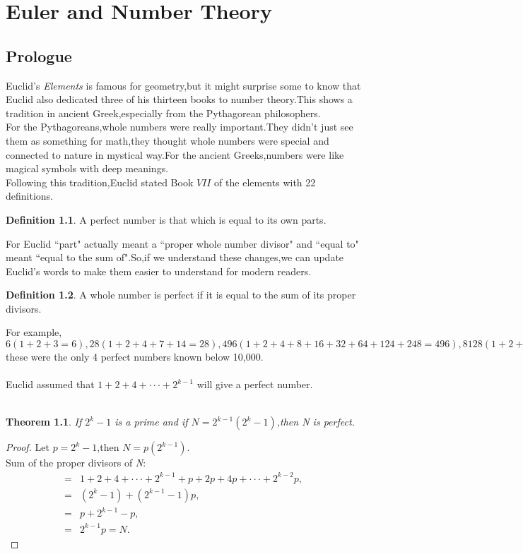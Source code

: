 \documentclass[a4paper,reqno,11pt]{book}
\theoremstyle{plain}%
\newtheorem{thm}{Theorem}[chapter]
\theoremstyle{definition}
\newtheorem{defn}{Definition}[chapter]
\begin{document}
\chapter{Euler and Number Theory}
\section{Prologue}
Euclid's \textit{Elements} is famous for geometry,but it might surprise some to know that Euclid also dedicated three of his thirteen books to number theory.This shows a tradition in ancient Greek,especially from the Pythagorean philosophers.\\
For the Pythagoreans,whole numbers were really important.They didn't just see them as something for math,they thought whole numbers were special and connected to nature in mystical way.For the ancient Greeks,numbers were like magical symbols with deep meanings.\\
Following this tradition,Euclid stated Book $VII$ of the elements with 22 definitions.
\begin{defn}\label{defn:Type 1}
A perfect number is that which is equal to its own parts.
\end{defn}
For Euclid ``part" actually meant a ``proper whole number divisor" and ``equal to" meant ``equal to the sum of".So,if we understand these changes,we can update Euclid's words to make them easier to understand for modern readers.
\begin{defn}\label{defn:Type 2}
A whole number is perfect if it is equal to the sum of its proper divisors.
\end{defn}
For example,$6(1+2+3=6),28(1+2+4+7+14=28),496(1+2+4+8+16+32+64+124+248=496),8128(1+2+4+8+16+32+64+127+254+508+1016+2032+4062=8128),$
these were the only 4 perfect numbers known below 10,000.\\
\\
Euclid assumed that $1+2+4+\cdot\cdot\cdot+2^{k-1}$ will give a perfect number.\\
\\
\begin{thm}\label{thm:Type 1}
\textit{If $2^k-1$ is a prime and if $N=2^{k-1}(2^k-1)$,then N is perfect.}
\end{thm}
\begin{proof}
    Let $p=2^k-1$,then $N=p(2^{k-1})$.\\
Sum of the proper divisors of \textit{N}:
\begin{align*}
    =&1+2+4+\cdot\cdot\cdot+2^{k-1}+p+2p+4p+\cdot\cdot\cdot+2^{k-2}p,\\
    =&(2^k-1)+(2^{k-1}-1)p,\\
    =&p+2^{k-1}-p,\\
    =&2^{k-1}p=N.
\end{align*}
\end{proof}
\end{document}

